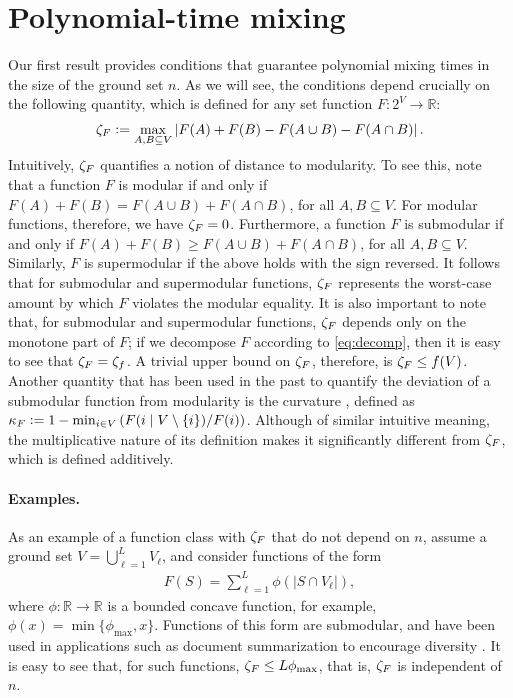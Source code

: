\section{Polynomial-time mixing} \label{sect:poly}
Our first result provides conditions that guarantee polynomial mixing times in the size of the ground set $n$.
As we will see, the conditions depend crucially on the following quantity, which is defined for any set function $F : 2^V \to \mathbb{R}$:
\begin{align*}
  \zeta_F \vcentcolon= \max_{A, B \subseteq V} \left|F(A) + F(B) - F(A \cup B) - F(A \cap B) \right|.
\end{align*}
Intuitively, $\zeta_F$ quantifies a notion of distance to modularity.
To see this, note that a function $F$ is modular if and only if $F(A) + F(B) = F(A \cup B) + F(A \cap B)$, for all $A, B \subseteq V$.
For modular functions, therefore, we have $\zeta_F = 0$.
Furthermore, a function $F$ is submodular if and only if $F(A) + F(B) \geq F(A \cup B) + F(A \cap B)$, for all $A, B \subseteq V$.
Similarly, $F$ is supermodular if the above holds with the sign reversed.
It follows that for submodular and supermodular functions, $\zeta_F$ represents the worst-case amount by which $F$ violates the modular equality.
It is also important to note that, for submodular and supermodular functions, $\zeta_F$ depends only on the monotone part of $F$; if we decompose $F$ according to \eqref{eq:decomp}, then it is easy to see that $\zeta_F = \zeta_f$.
A trivial upper bound on $\zeta_F$, therefore, is $\zeta_F \leq f(V)$.
Another quantity that has been used in the past to quantify the deviation of a submodular function from modularity is the curvature \cite{conforti84}, defined as $\kappa_F \vcentcolon= 1 - \min_{i \in V} \left(F(i\mid V\setminus\{i\}) / F(i)\right)$.
Although of similar intuitive meaning, the multiplicative nature of its definition makes it significantly different from $\zeta_F$, which is defined additively.

\paragraph{Examples.}
As an example of a function class with $\zeta_F$ that do not depend on $n$, assume a ground set $V = \bigcup_{\ell = 1}^L V_{\ell}$, and consider functions of the form
\begin{align*}
F(S) = \sum_{\ell = 1}^L \phi(|S \cap V_{\ell}|),
\end{align*}
where $\phi : \mathbb{R} \to \mathbb{R}$ is a bounded concave function, for example, $\phi(x) = \min\{\phi_{\max}, x\}$.
Functions of this form are submodular, and have been used in applications such as document summarization to encourage diversity \citep{lin11}.
It is easy to see that, for such functions, $\zeta_F \leq L\phi_{\max}$, that is, $\zeta_F$ is independent of $n$.

